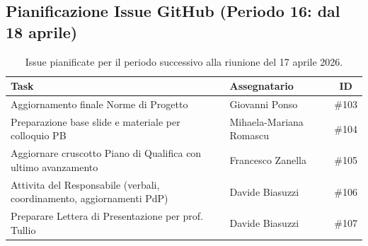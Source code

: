 \documentclass[a4paper, 11pt, oneside]{scrartcl}
\begin{document}
\subsection{Pianificazione Issue GitHub (Periodo 16: dal 18 aprile)}
\begin{table}[h!]
\centering
\small
\begin{tabularx}{\textwidth}{@{}X l c@{}}
\toprule
\textbf{Task} & \textbf{Assegnatario} & \textbf{ID} \\
\midrule
Aggiornamento finale Norme di Progetto & Giovanni Ponso & \#103 \\
\addlinespace
Preparazione base slide e materiale per colloquio PB & Mihaela-Mariana Romascu & \#104 \\
\addlinespace
Aggiornare cruscotto Piano di Qualifica con ultimo avanzamento & Francesco Zanella & \#105 \\
\addlinespace 
Attivita del Responsabile (verbali, coordinamento, aggiornamenti PdP) & Davide Biasuzzi & \#106 \\
\addlinespace
Preparare Lettera di Presentazione per prof. Tullio & Davide Biasuzzi & \#107 \\
\bottomrule
\end{tabularx}
\caption{Issue pianificate per il periodo successivo alla riunione del 17 aprile 2026.}
\end{table}
\end{document}

